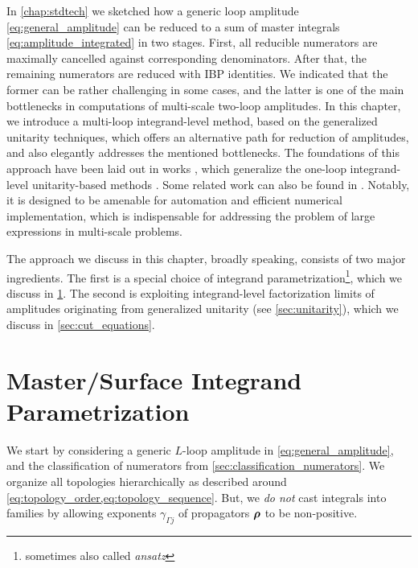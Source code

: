 In \cref{chap:stdtech} we sketched how a generic loop amplitude \eqref{eq:general_amplitude} can be reduced
to a sum of master integrals \eqref{eq:amplitude_integrated} in two stages.
First, all reducible numerators are maximally cancelled against corresponding denominators.
After that, the remaining numerators are reduced with IBP identities.
We indicated that the former can be rather challenging in some cases,
and the latter is one of the main bottlenecks in computations of multi-scale two-loop amplitudes.
In this chapter, we introduce a multi-loop integrand-level method, based on the generalized unitarity techniques,
which offers an alternative path for reduction of amplitudes, and also elegantly addresses the mentioned bottlenecks.
The foundations of this approach have been laid out in works \cite{Ita:2015tya,Abreu:2017xsl,Abreu:2017hqn,Abreu:2017idw},
which generalize the one-loop integrand-level unitarity-based methods \cite{Ossola:2006us,Giele:2008ve,Ellis:2008ir}.
Some related work can also be found in 
\cite{Mastrolia:2011pr,Badger:2012dp,Badger:2013gxa,Zhang:2012ce,Mastrolia:2013kca,Mastrolia:2016dhn,Mastrolia:2012an,Kleiss:2012yv,Feng:2012bm,Kosower:2011ty}.
Notably, it is designed to be amenable for automation and efficient numerical implementation, which is indispensable
for addressing the problem of large expressions in multi-scale problems.

The approach we discuss in this chapter, broadly speaking, consists of two major ingredients.
The first is a special choice of integrand parametrization\footnote{sometimes also called \emph{ansatz}},
which we discuss in \cref{sec:ansatz_integrand}.
The second is exploiting integrand-level factorization limits of amplitudes originating from generalized unitarity (see \cref{sec:unitarity}),
which we discuss in \cref{sec:cut_equations}.




\section{Master/Surface Integrand Parametrization}
\label{sec:ansatz_integrand}

We start by considering a generic $L$-loop amplitude in \cref{eq:general_amplitude},
and  the classification of numerators from \cref{sec:classification_numerators}.
We organize all topologies hierarchically as described around \cref{eq:topology_order,eq:topology_sequence}.
But, we \emph{do not} cast integrals into families by allowing exponents $\gamma_{\Gamma j}$ of propagators $\vb*{\rho}$ to be non-positive.

